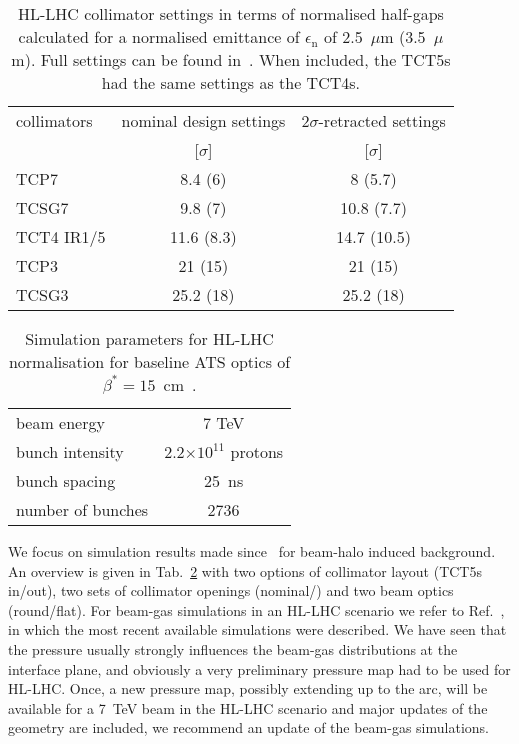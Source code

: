  \begin{table}%
   \centering
   \caption{HL-LHC collimator settings in terms of normalised half-gaps calculated for a normalised emittance of $\epsilon_{\mathrm{n}}$ of 2.5~$\mu$m (3.5~$\mu$m). Full settings can be found in~\cite{collSettRef}. When included, the TCT5s had the same settings as the TCT4s. }

   \begin{tabular}{l|c|c}
       \hline
       collimators &        nominal design settings & $2\sigma$-retracted settings\\
                   &         [$\sigma$] &  [$\sigma$]\\
       \hline
       TCP7 & 8.4 (6)& 8 (5.7) \\
       TCSG7 & 9.8 (7) & 10.8 (7.7) \\
       TCT4 IR1/5 & 11.6 (8.3) & 14.7 (10.5) \\
       TCP3 & 21 (15) & 21 (15) \\
       TCSG3 & 25.2 (18) & 25.2 (18)\\
       \hline
   \end{tabular}
   \label{HLcollSettings}
\end{table}

\begin{table}%
   \centering
   \caption{Simulation parameters for HL-LHC normalisation for baseline ATS optics of $\beta^* = 15$~cm~\cite{ATSref}.}
   \begin{tabular}{l|c}
       \hline
       beam energy & 7 TeV \\
       bunch intensity & 2.2$\times 10^{11}$ protons\\
       bunch spacing & 25~ns \\
       number of bunches & 2736 \\
       \hline
   \end{tabular}
   \label{hlscenario}
\end{table}


We focus on simulation results made since~\cite{kweeIpac14} for beam-halo induced background. An overview is given in Tab.~\ref{hlscenario} with two options of collimator layout (TCT5s in/out), two sets of collimator openings (nominal/\twosigmaret) and two beam optics (round/flat). For beam-gas simulations in an HL-LHC scenario we refer to Ref.~\cite{kweeIpac14}, in which the most recent available simulations were described. We have seen that the pressure usually strongly influences the beam-gas distributions at the interface plane, and obviously a very preliminary pressure map had to be used for HL-LHC. Once, a new pressure map, possibly extending up to the arc, will be available for a 7~TeV beam in the HL-LHC scenario and major updates of the geometry are included, we recommend an update of the beam-gas simulations. 

